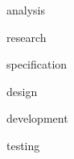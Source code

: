 \documentclass[12pt]{report}
\begin{document}




\newpage
\tableofcontents

\newpage
\listoffigures

\newpage
\listoftables

{analysis}

{research}

{specification}

{design}

{development}

{testing}





\end{document}
